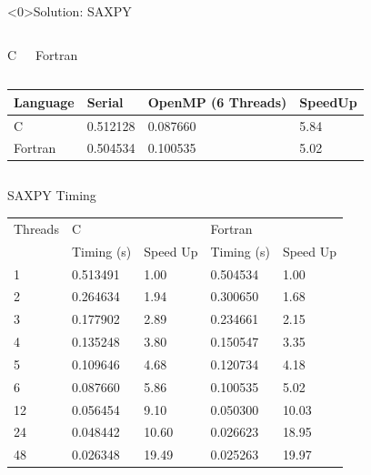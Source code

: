 \documentclass[10pt,t]{beamer}
\begin{document}
\begin{frame}<0>{Solution: SAXPY}
  \vspace{-0.5cm}
  \begin{columns}
    \begin{exampleblock}{C}
      
    \end{exampleblock}
    \begin{exampleblock}{Fortran}
      
    \end{exampleblock}
  \end{columns}
  \begin{columns}
    {
      \begin{exampleblock}{}
        \begin{tabular}{|b|b|b|b|}
          \hline
          \rowcolor{lublue}Language & Serial & OpenMP (6 Threads) & SpeedUp \\
          \hline
          C & 0.512128 & 0.087660 & 5.84 \\ \hline
          Fortran & 0.504534 & 0.100535 & 5.02 \\
          \hline
        \end{tabular}
      \end{exampleblock}
    }
  \end{columns}
\end{frame}

\begin{frame}{SAXPY Timing}
  \begin{exampleblock}{}
    \begin{center}
      \begin{tabular}{|b|b|b|b|b|}
        \hline
        \rowcolor{lublue}Threads & \multicolumn{2}{b|}{C} & \multicolumn{2}{b|}{Fortran} \\
        \cline{2-5}
        \rowcolor{lublue}& Timing (s) & Speed Up & Timing (s) & Speed Up \\
        \hline
        1 & 0.513491  &  1.00  & 0.504534  &   1.00 \\
        2 & 0.264634  &  1.94  & 0.300650  &   1.68 \\
        3 & 0.177902  &  2.89  & 0.234661  &   2.15 \\
        4 & 0.135248  &  3.80  & 0.150547  &   3.35 \\
        5 & 0.109646  &  4.68  & 0.120734  &   4.18 \\
        6 & 0.087660  &  5.86  & 0.100535  &   5.02 \\
        12 & 0.056454 &  9.10  & 0.050300  &  10.03 \\
        24 & 0.048442 & 10.60  & 0.026623  &  18.95 \\
        48 & 0.026348 & 19.49  & 0.025263  &  19.97 \\
        \hline
      \end{tabular}
    \end{center}
    \end{exampleblock}
\end{frame}
\end{document}
